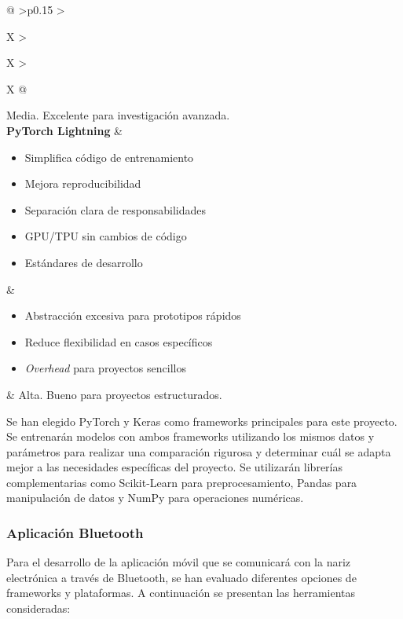 \begin{xltabular}{\textwidth}{@{} >{\centering\arraybackslash}p{0.15\textwidth} >{\raggedright\arraybackslash}X >{\raggedright\arraybackslash}X >{\raggedright\arraybackslash}X @{}}
	Media. Excelente para investigación avanzada. \\
	\midrule
	\textbf{PyTorch Lightning} &
	\begin{itemize}[nosep] \item Simplifica código de entrenamiento \item Mejora reproducibilidad \item Separación clara de responsabilidades \item GPU/TPU sin cambios de código \item Estándares de desarrollo \end{itemize} &
	\begin{itemize}[nosep] \item Abstracción excesiva para prototipos rápidos \item Reduce flexibilidad en casos específicos \item \textit{Overhead} para proyectos sencillos \end{itemize} &
	Alta. Bueno para proyectos estructurados. \\
\end{xltabular}
{\captionsetup{type=table,hypcap=false}\label{tab:comparativa_frameworks_ann}}

\normalsize

Se han elegido PyTorch y Keras como frameworks principales para este proyecto. Se entrenarán modelos con ambos frameworks utilizando los mismos datos y parámetros para realizar una comparación rigurosa y determinar cuál se adapta mejor a las necesidades específicas del proyecto. Se utilizarán librerías complementarias como Scikit-Learn para preprocesamiento, Pandas para manipulación de datos y NumPy para operaciones numéricas.

\subsubsection{Aplicación Bluetooth}

Para el desarrollo de la aplicación móvil que se comunicará con la nariz electrónica a través de Bluetooth, se han evaluado diferentes opciones de frameworks y plataformas. A continuación se presentan las herramientas consideradas:

